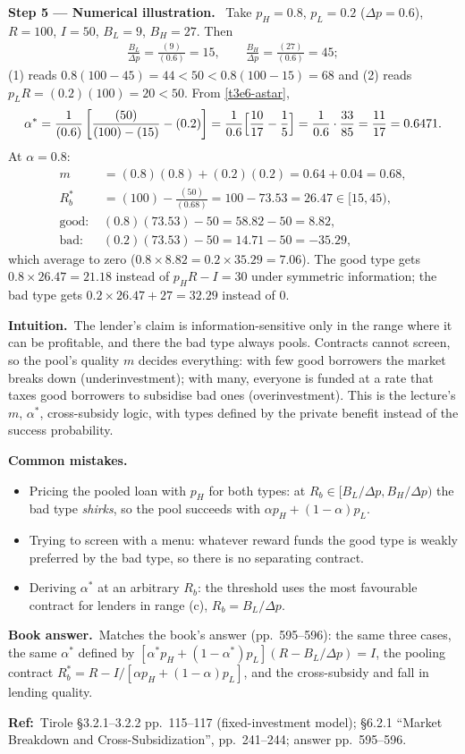 \documentclass[11pt,a4paper]{article}
\newcommand{\step}[2]{\par\medskip\noindent\textbf{Step #1 --- #2.}~}
\newcommand{\intuition}{\par\medskip\noindent\textbf{Intuition.}~}
\newcommand{\bookans}{\par\medskip\noindent\textbf{Book answer.}~}
\newcommand{\refbib}{\par\smallskip\noindent\textbf{Ref:}~}
\newcommand{\pitfalls}{\par\medskip\noindent\textbf{Common mistakes.}}
\begin{document}
\step{5}{Numerical illustration} Take $p_H=0.8$, $p_L=0.2$ ($\Delta p=0.6$), $R=100$, $I=50$, $B_L=9$, $B_H=27$. Then
\begin{align}
  \frac{B_L}{\Delta p} = \frac{(9)}{(0.6)} = 15, \qquad \frac{B_H}{\Delta p} = \frac{(27)}{(0.6)} = 45; \nonumber
\end{align}
(1) reads $0.8(100-45)=44<50<0.8(100-15)=68$ and (2) reads $p_LR=(0.2)(100)=20<50$. From \eqref{t3e6-astar},
\begin{align}
  \alpha^* = \frac{1}{(0.6)}\left[\frac{(50)}{(100)-(15)}-(0.2)\right] = \frac{1}{0.6}\Bigl[\frac{10}{17}-\frac{1}{5}\Bigr] = \frac{1}{0.6}\cdot\frac{33}{85} = \frac{11}{17} = 0.6471. \nonumber
\end{align}
At $\alpha=0.8$:
\begin{align}
  m &= (0.8)(0.8)+(0.2)(0.2) = 0.64+0.04 = 0.68, \nonumber\\
  R_b^* &= (100)-\frac{(50)}{(0.68)} = 100-73.53 = 26.47\in[15,45), \nonumber\\
  \text{good: } & (0.8)(73.53)-50 = 58.82-50 = 8.82, \nonumber\\
  \text{bad: } & (0.2)(73.53)-50 = 14.71-50 = -35.29, \nonumber
\end{align}
which average to zero ($0.8\times8.82=0.2\times35.29=7.06$). The good type gets $0.8\times26.47=21.18$ instead of $p_HR-I=30$ under symmetric information; the bad type gets $0.2\times26.47+27=32.29$ instead of $0$.

\intuition The lender's claim is information-sensitive only in the range where it can be profitable, and there the bad type always pools. Contracts cannot screen, so the pool's quality $m$ decides everything: with few good borrowers the market breaks down (underinvestment); with many, everyone is funded at a rate that taxes good borrowers to subsidise bad ones (overinvestment). This is the lecture's $m$, $\alpha^*$, cross-subsidy logic, with types defined by the private benefit instead of the success probability.

\pitfalls
\begin{itemize}
  \item Pricing the pooled loan with $p_H$ for both types: at $R_b\in[B_L/\Delta p,B_H/\Delta p)$ the bad type \emph{shirks}, so the pool succeeds with $\alpha p_H+(1-\alpha)p_L$.
  \item Trying to screen with a menu: whatever reward funds the good type is weakly preferred by the bad type, so there is no separating contract.
  \item Deriving $\alpha^*$ at an arbitrary $R_b$: the threshold uses the most favourable contract for lenders in range (c), $R_b=B_L/\Delta p$.
\end{itemize}
\bookans Matches the book's answer (pp.~595--596): the same three cases, the same $\alpha^*$ defined by $[\alpha^*p_H+(1-\alpha^*)p_L](R-B_L/\Delta p)=I$, the pooling contract $R_b^*=R-I/[\alpha p_H+(1-\alpha)p_L]$, and the cross-subsidy and fall in lending quality.
\refbib{Tirole \S3.2.1--3.2.2 pp.~115--117 (fixed-investment model); \S6.2.1 ``Market Breakdown and Cross-Subsidization'', pp.~241--244; answer pp.~595--596.}
\end{document}
